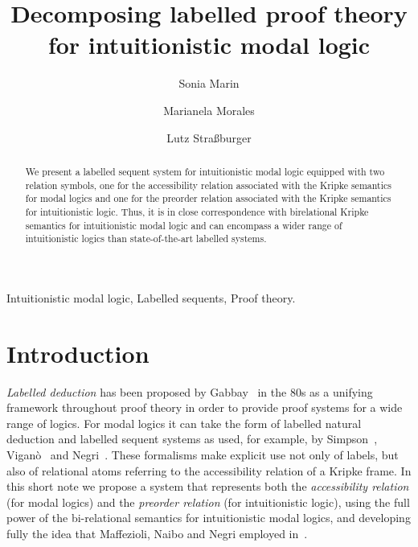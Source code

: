 \documentclass[twoside]{aiml18}
\begin{document}
\begin{frontmatter}
  \title{Decomposing labelled proof theory for intuitionistic modal logic}
  \author{Sonia Marin}
  \address{IT-Universitetet i K{\o}benhavn \\ Denmark }
 \author{Marianela Morales}
 \address{Universidad Nacional de C\'ordoba \\ Argentina}
   \author{Lutz Stra{\ss}burger}
 \address{Inria Saclay \& LIX, \'Ecole Polytechnique \\ France}

 \begin{abstract}
   We present a labelled sequent system for intuitionistic modal logic equipped 
   with two relation symbols, one for the accessibility
   relation associated with the Kripke semantics for modal logics and
   one for the preorder relation associated with the Kripke semantics
   for intuitionistic logic. 
   Thus, it is in close correspondence with birelational Kripke semantics for intuitionistic modal logic and can encompass a wider range of intuitionistic logics than state-of-the-art labelled systems.


  \end{abstract}

  \begin{keyword}
  Intuitionistic modal logic, Labelled sequents, Proof theory.
  \end{keyword}
 \end{frontmatter}


\section{Introduction}

\emph{Labelled deduction} has been proposed by Gabbay~\cite{Gabbay} in the 80s as a unifying framework throughout proof theory in order to provide proof
systems for a wide range of logics. 
%
For modal logics it can take
the form of labelled natural deduction and labelled sequent systems as
used, for example, by Simpson~\cite{Simpson}, Vigan\`o~\cite{Vigano} and
Negri~\cite{Negri}. 
%
These formalisms make explicit use not only of
labels, but also of relational atoms referring to the accessibility relation of a Kripke frame.
%
In this short note we propose a system that represents both the \emph{accessibility relation} (for modal
logics) and the \emph{preorder relation} (for intuitionistic
logic), using the full power of the bi-relational semantics for
intuitionistic modal logics,
and developing fully the idea that Maffezioli, Naibo and Negri employed in~\cite{Maffezioli}. 
\end{document}
